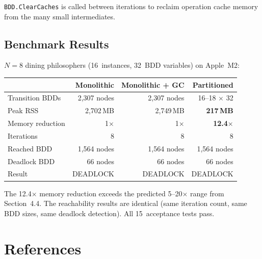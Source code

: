 \documentclass[11pt]{article}
\begin{document}
\texttt{BDD.ClearCaches} is called between iterations to reclaim
operation cache memory from the many small intermediates.

\subsection{Benchmark Results}

$N = 8$ dining philosophers (16~instances, 32~BDD variables) on
Apple~M2:

\begin{center}
\begin{tabular}{lrrr}
\toprule
& \textbf{Monolithic} & \textbf{Monolithic + GC} & \textbf{Partitioned} \\
\midrule
Transition BDDs    & 2,307 nodes       & 2,307 nodes       & 16--18 $\times$ 32 \\
Peak RSS           & 2,702\,MB         & 2,749\,MB         & \textbf{217\,MB} \\
Memory reduction   & 1$\times$         & 1$\times$         & \textbf{12.4$\times$} \\
Iterations         & 8                 & 8                 & 8 \\
Reached BDD        & 1,564 nodes       & 1,564 nodes       & 1,564 nodes \\
Deadlock BDD       & 66 nodes          & 66 nodes          & 66 nodes \\
Result             & DEADLOCK          & DEADLOCK          & DEADLOCK \\
\bottomrule
\end{tabular}
\end{center}

The 12.4$\times$ memory reduction exceeds the predicted 5--20$\times$
range from Section~4.4.  The reachability results are identical
(same iteration count, same BDD sizes, same deadlock detection).
All 15~acceptance tests pass.

\section{References}
\end{document}
